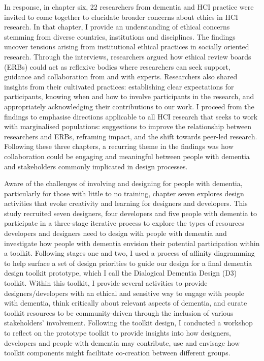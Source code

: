 In response, in chapter six, 22 researchers from dementia and HCI practice were invited to come together to elucidate broader concerns about ethics in HCI research. In that chapter, I provide an understanding of ethical concerns stemming from diverse countries, institutions and disciplines. The findings uncover tensions arising from institutional ethical practices in socially oriented research. Through the interviews, researchers argued how ethical review boards (ERBs) could act as reflexive bodies where researchers can seek support, guidance and collaboration from and with experts. Researchers also shared insights from their cultivated practices: establishing clear expectations for participants, knowing when and how to involve participants in the research, and appropriately acknowledging their contributions to our work. I proceed from the findings to emphasise directions applicable to all HCI research that seeks to work with marginalised populations: suggestions to improve the relationship between researchers and ERBs, reframing impact, and the shift towards peer-led research. Following these three chapters, a recurring theme in the findings was how collaboration could be engaging and meaningful between people with dementia and stakeholders commonly implicated in design processes.

Aware of the challenges of involving and designing for people with dementia, particularly for those with little to no training, chapter seven explores design activities that evoke creativity and learning for designers and developers. This study recruited seven designers, four developers and five people with dementia to participate in a three-stage iterative process to explore the types of resources developers and designers need to design with people with dementia and investigate how people with dementia envision their potential participation within a toolkit. Following stages one and two, I used a process of affinity diagramming to help surface a set of design priorities to guide our design for a final dementia design toolkit prototype, which I call the Dialogical Dementia Design (D3) toolkit. Within this toolkit, I provide several activities to provide designers/developers with an ethical and sensitive way to engage with people with dementia, think critically about relevant aspects of dementia, and curate toolkit resources to be community-driven through the inclusion of various stakeholders’ involvement. Following the toolkit design, I conducted a workshop to reflect on the prototype toolkit to provide insights into how designers, developers and people with dementia may contribute, use and envisage how toolkit components might facilitate co-creation between different groups.

